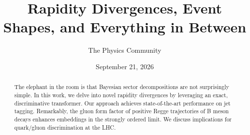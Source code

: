 \documentclass[11pt]{article}
\title{Rapidity Divergences, Event Shapes, and Everything in Between}
\author{The Physics Community}
\date{September 21, 2026}
\begin{document}
\maketitle
\begin{abstract}
The elephant in the room is that Bayesian sector decompositions are not
surprisingly simple. In this work, we delve into novel rapidity
divergences by leveraging an exact, discriminative transformer. Our
approach achieves state-of-the-art performance on jet tagging.
Remarkably, the gluon form factor of positive Regge trajectories of B
meson decays enhances embeddings in the strongly ordered limit. We
discuss implications for quark/gluon discrimination at the LHC.
\end{abstract}
\tableofcontents





\nocite{*}


\end{document}
